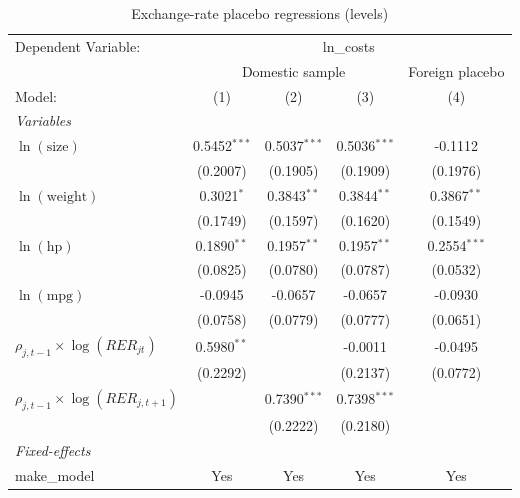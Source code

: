 
\begin{table}[htbp]
   \caption{\label{tab:cost_reg_placebo_levels} Exchange-rate placebo regressions (levels)}
   \centering
   \begin{tabular}{lcccc}
      \tabularnewline \midrule \midrule
      Dependent Variable: & \multicolumn{4}{c}{ln\_costs}\\
       & \multicolumn{3}{c}{Domestic sample} & Foreign placebo \\
      Model:                                   & (1)            & (2)            & (3)            & (4)\\
      \midrule
      \emph{Variables}\\
      $\ln(\text{size})$                       & 0.5452$^{***}$ & 0.5037$^{***}$ & 0.5036$^{***}$ & -0.1112\\
                                               & (0.2007)       & (0.1905)       & (0.1909)       & (0.1976)\\
      $\ln(\text{weight})$                     & 0.3021$^{*}$   & 0.3843$^{**}$  & 0.3844$^{**}$  & 0.3867$^{**}$\\
                                               & (0.1749)       & (0.1597)       & (0.1620)       & (0.1549)\\
      $\ln(\text{hp})$                         & 0.1890$^{**}$  & 0.1957$^{**}$  & 0.1957$^{**}$  & 0.2554$^{***}$\\
                                               & (0.0825)       & (0.0780)       & (0.0787)       & (0.0532)\\
      $\ln(\text{mpg})$                        & -0.0945        & -0.0657        & -0.0657        & -0.0930\\
                                               & (0.0758)       & (0.0779)       & (0.0777)       & (0.0651)\\
      $\rho_{j,t-1}\times\log(RER_{jt})$       & 0.5980$^{**}$  &                & -0.0011        & -0.0495\\
                                               & (0.2292)       &                & (0.2137)       & (0.0772)\\
      $\rho_{j,t-1}\times\log(RER_{j,t+1})$    &                & 0.7390$^{***}$ & 0.7398$^{***}$ &   \\
                                               &                & (0.2222)       & (0.2180)       &   \\
      \midrule
      \emph{Fixed-effects}\\
      make\_model                              & Yes            & Yes            & Yes            & Yes\\

\end{tabular}
\end{table}
